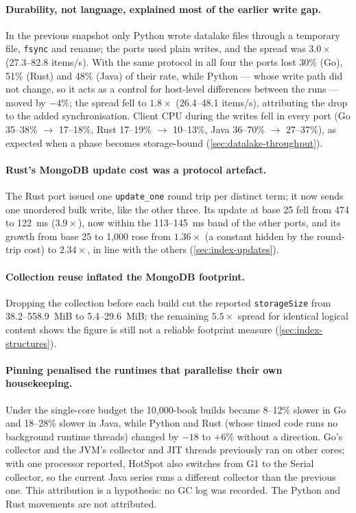 \paragraph{Durability, not language, explained most of the earlier write gap.}
In the previous snapshot only Python wrote datalake files through a
temporary file, \texttt{fsync} and rename; the ports used plain writes, and
the spread was $3.0\times$ (27.3--82.8 items/s). With the same protocol in
all four the ports lost 30\% (Go), 51\% (Rust) and 48\% (Java) of their
rate, while Python --- whose write path did not change, so it acts as a
control for host-level differences between the runs --- moved by $-4\%$;
the spread fell to $1.8\times$ (26.4--48.1 items/s), attributing the drop
to the added synchronisation. Client CPU during the writes fell in every
port (Go 35--38\% $\to$ 17--18\%, Rust 17--19\% $\to$ 10--13\%, Java
36--70\% $\to$ 27--37\%), as expected when a phase becomes storage-bound
(\cref{sec:datalake-throughput}).

\paragraph{Rust's MongoDB update cost was a protocol artefact.}
The Rust port issued one \texttt{update\_one} round trip per distinct term;
it now sends one unordered bulk write, like the other three. Its update at
base 25 fell from 474 to 122~ms ($3.9\times$), now within the 113--145~ms
band of the other ports, and its growth from base 25 to 1{,}000 rose from
$1.36\times$ (a constant hidden by the round-trip cost) to $2.34\times$, in
line with the others (\cref{sec:index-updates}).

\paragraph{Collection reuse inflated the MongoDB footprint.}
Dropping the collection before each build cut the reported
\texttt{storageSize} from 38.2--558.9~MiB to 5.4--29.6~MiB; the remaining
$5.5\times$ spread for identical logical content shows the figure is still
not a reliable footprint measure (\cref{sec:index-structures}).

\paragraph{Pinning penalised the runtimes that parallelise their own housekeeping.}
Under the single-core budget the 10{,}000-book builds became 8--12\% slower
in Go and 18--28\% slower in Java, while Python and Rust (whose timed code
runs no background runtime threads) changed by $-18$ to $+6\%$ without a
direction. Go's collector and the JVM's collector and JIT threads previously
ran on other cores; with one processor reported, HotSpot also switches from
G1 to the Serial collector, so the current Java series runs a different
collector than the previous one. This attribution is a hypothesis: no GC log
was recorded. The Python and Rust movements are not attributed.


